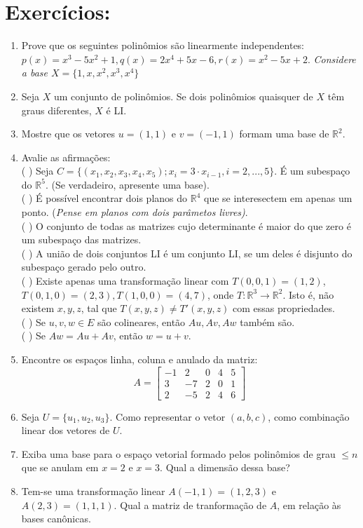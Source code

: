 \documentclass[12pt,letterpaper]{article}
\begin{document}
\section*{Exercícios: }
\begin{enumerate}
    \item Prove que os seguintes polinômios são linearmente independentes: $p(x) = x^3 - 5x^2 + 1, q(x) = 2x^4 + 5x - 6, r(x) = x^2 - 5x + 2$. 
    \textit{Considere a base $X = \{1, x, x^2, x^3, x^4\}$} 
    \item Seja $X$ um conjunto de polinômios.  Se dois polinômios quaisquer de $X$ têm graus diferentes, $X$ é LI.
    \item Mostre que os vetores $u = (1,1)$ e $v = (-1,1)$ formam uma base de $\mathbb{R}^2$. 
    \item Avalie as afirmações: \\
    ( ) Seja $C = \{(x_1,x_2,x_3,x_4,x_5); x_i = 3\cdot x_{i-1}, i=2,...,5\}$. É um subespaço do $\mathbb{R}^5$. (Se verdadeiro, apresente uma base). \\
    ( ) É possível encontrar dois planos do $\mathbb{R}^4$ que se interesectem em apenas um ponto. (\textit{Pense em planos com dois parâmetos livres)}.\\
    ( ) O conjunto de todas as matrizes cujo determinante é maior do que zero é um subespaço das matrizes. \\
    ( ) A união de dois conjuntos LI é um conjunto LI, se  um deles é disjunto do subespaço gerado pelo outro. \\
    ( ) Existe apenas uma transformação linear com $T(0,0,1) = (1,2)$, $T(0,1,0) = (2,3), T(1,0,0) = (4,7) $, onde $T: \mathbb{R}^3\to \mathbb{R}^2$. Isto é, não existem $x,y,z$, tal que $T(x,y,z) \neq T'(x,y,z)$ com essas propriedades. \\
    (  ) Se $u, v, w \in E$ são colineares, então $Au,Av,Aw$ também são. \\
    (  ) Se $Aw = Au + Av$, então $w = u + v$. 
    \item Encontre os espaços linha, coluna e anulado da matriz:
    $$
    A = \left[
    \begin{array}{ccccc}
    -1 & 2 & 0 & 4 & 5\\
    3 & -7 & 2 & 0 & 1\\
    2 & -5 & 2 & 4 & 6
    \end{array}
    \right]
    $$
    \item Seja $U = \{u_1,u_2,u_3\}$. Como representar o vetor $(a,b,c)$, como combinação linear dos vetores de $U$. 
    \item Exiba uma base para o espaço vetorial formado pelos polinômios de grau $\leq n$ que se anulam em $x=2$ e $x=3$. Qual a dimensão dessa base? 
    \item Tem-se uma transformação linear $A(-1,1) = (1,2,3)$ e $A(2,3) = (1,1,1)$. Qual a matriz de tranformação de $A$, em relação às bases canônicas. 

    \end{enumerate}
\end{document}
